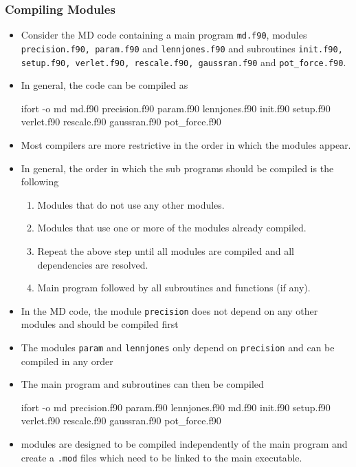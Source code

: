 \documentclass[slidestop,mathserif,compress,xcolor=svgnames]{beamer}
\begin{document}
\begin{frame}[allowframebreaks]
  \frametitle{\small Compiling Modules}
  \begin{itemize}
    \item Consider the MD code containing a main program \texttt{md.f90}, modules \texttt{precision.f90, param.f90} and \texttt{lennjones.f90} and subroutines \texttt{init.f90, setup.f90, verlet.f90, rescale.f90, gaussran.f90} and \texttt{pot\_force.f90}.
    \item In general, the code can be compiled as 
    \begin{block}{}
      {\tiny
        ifort -o md md.f90 precision.f90 param.f90 lennjones.f90 init.f90 setup.f90 verlet.f90 rescale.f90 gaussran.f90 pot\_force.f90
      }
    \end{block}
    \item Most compilers are more restrictive in the order in which the modules appear.
    \item In general, the order in which the sub programs should be compiled is the following
    \begin{enumerate}
      \item Modules that do not use any other modules.
      \item Modules that use one or more of the modules already compiled.
      \item Repeat the above step until all modules are compiled and all dependencies are resolved.
      \item Main program followed by all subroutines and functions (if any).
    \end{enumerate}
    \item In the MD code, the module \texttt{precision} does not depend on any other modules and should be compiled first
    \item The modules \texttt{param} and \texttt{lennjones} only depend on \texttt{precision} and can be compiled in any order
    \item The main program and subroutines can then be compiled
    \begin{block}{}
      {\tiny
        ifort -o md precision.f90 param.f90 lennjones.f90 md.f90 init.f90 setup.f90 verlet.f90 rescale.f90 gaussran.f90 pot\_force.f90
      }
    \end{block}
    \item modules are designed to be compiled independently of the main program and create a \texttt{.mod} files which need to be linked to the main executable.
    \begin{block}{}

\end{block}
\end{itemize}
\end{frame}
\end{document}
